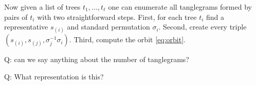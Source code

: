 \documentclass{amsart}
\begin{document}
Now given a list of trees $t_1, \ldots, t_\ell$ one can enumerate all tanglegrams formed by pairs of $t_i$ with two straightforward steps.
First, for each tree $t_i$ find a representative $s_{(i)}$ and standard permutation $\sigma_i$.
Second, create every triple $(s_{(i)}, s_{(j)}, \sigma_j^{-1} \sigma_i)$.
Third, compute the orbit \eqref{eq:orbit}.

Q: can we say anything about the number of tanglegrams?


Q: What representation is this?




\end{document}
